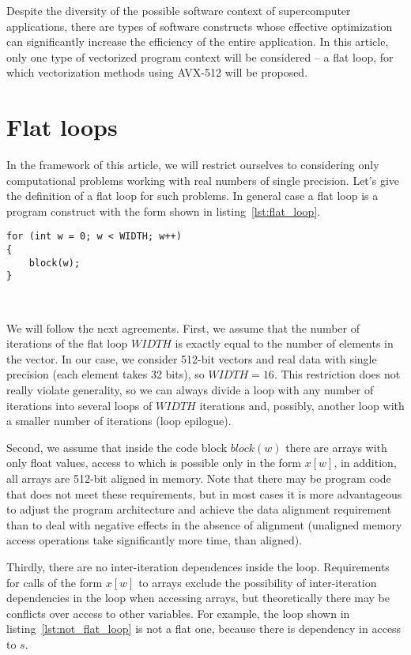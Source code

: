 \documentclass[
11pt,%
tightenlines,%
twoside,%
onecolumn,%
nofloats,%
nobibnotes,%
nofootinbib,%
superscriptaddress,%
noshowpacs,%
centertags]%
{revtex4}
\begin{document}
Despite the diversity of the possible software context of supercomputer applications, there are types of software constructs whose effective optimization can significantly increase the efficiency of the entire application.
In this article, only one type of vectorized program context will be considered -- a flat loop, for which vectorization methods using AVX-512 will be proposed.

\section{Flat loops}

In the framework of this article, we will restrict ourselves to considering only computational problems working with real numbers of single precision.
Let's give the definition of a flat loop for such problems.
In general case a flat loop is a program construct with the form shown in listing~\ref{lst:flat_loop}.

\begin{lstlisting}[caption={General view of a flat loop.},label={lst:flat_loop}]
for (int w = 0; w < WIDTH; w++)
{
    block(w);
}
\end{lstlisting}

\

We will follow the next agreements.
First, we assume that the number of iterations of the flat loop $WIDTH$ is exactly equal to the number of elements in the vector.
In our case, we consider 512-bit vectors and real data with single precision (each element takes 32 bits), so $WIDTH = 16$.
This restriction does not really violate generality, so we can always divide a loop with any number of iterations into several loops of $WIDTH$ iterations and, possibly, another loop with a smaller number of iterations (loop epilogue).

Second, we assume that inside the code block $block(w)$ there are arrays with only float values, access to which is possible only in the form $x[w]$, in addition, all arrays are 512-bit aligned in memory.
Note that there may be program code that does not meet these requirements, but in most cases it is more advantageous to adjust the program architecture and achieve the data alignment requirement than to deal with negative effects in the absence of alignment (unaligned memory access operations take significantly more time, than aligned).

Thirdly, there are no inter-iteration dependences inside the loop.
Requirements for calls of the form $x[w]$ to arrays exclude the possibility of inter-iteration dependencies in the loop when accessing arrays, but theoretically there may be conflicts over access to other variables.
For example, the loop shown in listing~\ref{lst:not_flat_loop} is not a flat one, because there is dependency in access to $s$.
\end{document}
